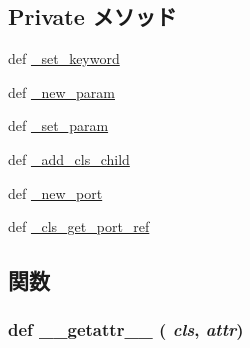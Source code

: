 \subsection*{Private メソッド}
\begin{DoxyCompactItemize}
\item 
def \hyperlink{classm5_1_1SimObject_1_1MetaSimObject_a5abb9e05651c6ebea8a449d8b9f631da}{\_\-set\_\-keyword}
\item 
def \hyperlink{classm5_1_1SimObject_1_1MetaSimObject_ac8e49572c0c90b02af544331ef1fe28c}{\_\-new\_\-param}
\item 
def \hyperlink{classm5_1_1SimObject_1_1MetaSimObject_ad9738835519febeb368f901e6185df14}{\_\-set\_\-param}
\item 
def \hyperlink{classm5_1_1SimObject_1_1MetaSimObject_a0d41fdb3a505fbc4c37db240d67c1140}{\_\-add\_\-cls\_\-child}
\item 
def \hyperlink{classm5_1_1SimObject_1_1MetaSimObject_a6490df0f3d3befd9c38994fa46520f70}{\_\-new\_\-port}
\item 
def \hyperlink{classm5_1_1SimObject_1_1MetaSimObject_aed37f2662342d9fb731fb7b3454eda7f}{\_\-cls\_\-get\_\-port\_\-ref}
\end{DoxyCompactItemize}


\subsection{関数}
\hypertarget{classm5_1_1SimObject_1_1MetaSimObject_a0a990b3ec3889d40889daca9ee5e4695}{
\subsubsection[{\_\-\_\-getattr\_\-\_\-}]{\setlength{\rightskip}{0pt plus 5cm}def \_\-\_\-getattr\_\-\_\- ( {\em cls}, \/   {\em attr})}}
\label{classm5_1_1SimObject_1_1MetaSimObject_a0a990b3ec3889d40889daca9ee5e4695}



